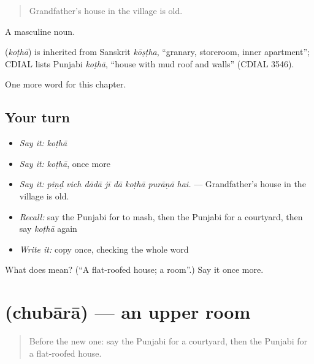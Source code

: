 \begin{quote}
Grandfather's house in the village is old.
\end{quote}

A masculine noun.

\begin{cousinweb}
\textbf{} (\emph{koṭhā}) is inherited from Sanskrit \emph{kōṣṭha}, \textquotedblleft{}granary, storeroom, inner apartment\textquotedblright{}; CDIAL lists Punjabi \emph{koṭhā}, \textquotedblleft{}house with mud roof and walls\textquotedblright{} (CDIAL 3546).
\end{cousinweb}

\begin{grammarlens}[title={What you've built}]
One more word for this chapter.
\end{grammarlens}

\subsection*{Your turn}
\begin{itemize}
\raggedright
  \item \emph{Say it:} \emph{koṭhā}
  \item \emph{Say it:} \emph{koṭhā}, once more
  \item \emph{Say it:} \emph{piṇḍ vich dādā jī dā koṭhā purāṇā hai.} — Grandfather's house in the village is old.
  \item \emph{Recall:} say the Punjabi for to mash, then the Punjabi for a courtyard, then say \emph{koṭhā} again
  \item \emph{Write it:} copy \textbf{} once, checking the whole word
\end{itemize}

\begin{tcolorbox}[breakable,colback=teal!4,colframe=teal!35!black,title={Before you move on}]
What does  mean? (\textquotedblleft{}A flat-roofed house; a room\textquotedblright{}.) Say it once more.
\end{tcolorbox}
\section[\texorpdfstring{\pa{ਚੁਬਾਰਾ} (chubārā)}{ਚੁਬਾਰਾ (chubārā)}]{ (chubārā) — an upper room}

\label{lesson:PA-C245-chubara}



\begin{quote}
Before the new one: say the Punjabi for a courtyard, then the Punjabi for a flat-roofed house.
\end{quote}


